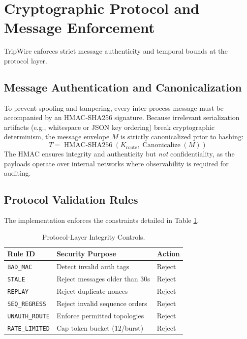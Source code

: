 \documentclass[10pt,a4paper]{article}
\begin{document}
\section{Cryptographic Protocol and Message Enforcement}

TripWire enforces strict message authenticity and temporal bounds at the protocol layer.

\subsection{Message Authentication and Canonicalization}
To prevent spoofing and tampering, every inter-process message must be accompanied by an HMAC-SHA256 signature. Because irrelevant serialization artifacts (e.g., whitespace or JSON key ordering) break cryptographic determinism, the message envelope $M$ is strictly canonicalized prior to hashing:
\begin{equation}
T = \operatorname{HMAC-SHA256}(K_{\text{route}}, \operatorname{Canonicalize}(M))
\end{equation}
The HMAC ensures integrity and authenticity but \textit{not} confidentiality, as the payloads operate over internal networks where observability is required for auditing.

\subsection{Protocol Validation Rules}
The implementation enforces the constraints detailed in Table \ref{tab:protocol_rules}.

\begin{table}[h]
\centering
\begin{tabularx}{\columnwidth}{l X l}
\toprule
\textbf{Rule ID} & \textbf{Security Purpose} & \textbf{Action} \\
\midrule
\texttt{BAD\_MAC} & Detect invalid auth tags & Reject \\
\texttt{STALE} & Reject messages older than 30s & Reject \\
\texttt{REPLAY} & Reject duplicate nonces & Reject \\
\texttt{SEQ\_REGRESS} & Reject invalid sequence orders & Reject \\
\texttt{UNAUTH\_ROUTE}& Enforce permitted topologies & Reject \\
\texttt{RATE\_LIMITED}& Cap token bucket (12/burst) & Reject \\
\bottomrule
\end{tabularx}
\caption{Protocol-Layer Integrity Controls.}
\label{tab:protocol_rules}
\end{table}
\end{document}
